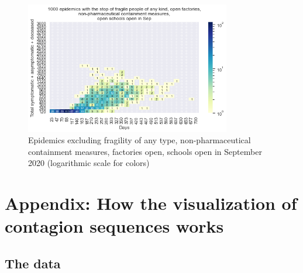 \documentclass[11pt]{article}
\begin{document}
\begin{figure}[H]
\begin{center}
\includegraphics[width=0.8\textwidth]{HM30_readRunResults1k_with_NoAllFrag_openFacs_at20_openSchoolSep_plusHMlog.png}
\caption{Epidemics excluding fragility of any type, non-pharmaceutical containment measures, factories open, schools open in September 2020 (logarithmic scale for colors)}
\label{EpidemicsNoAllFragileFacsOnSchOnHM}
\end{center}
\end{figure}







\section{Appendix: How the visualization of contagion sequences works}
\label{appHowItWorks}

\subsection{The data}
\end{document}
